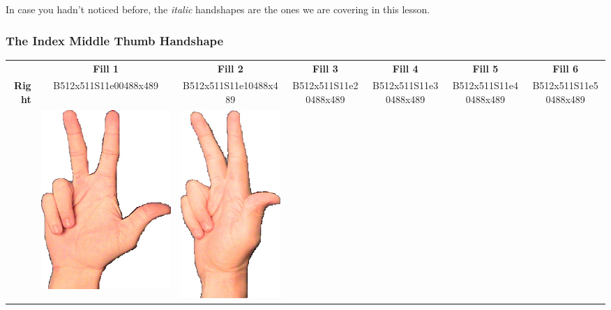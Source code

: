 \documentclass{article}
\begin{document}
In case you hadn't noticed before, the \emph{italic} handshapes are the ones we are covering in this lesson.

\subsubsection{The Index Middle Thumb Handshape}

\begin{center}
\begin{tabular}{r*{6}{c}}
&\textbf{Fill 1}&\textbf{Fill 2}&\textbf{Fill 3}&\textbf{Fill 4}&\textbf{Fill 5}&\textbf{Fill 6}\\
\multirow{2}{*}{\textbf{Right}}&
B512x511S11e00488x489&
B512x511S11e10488x489&
B512x511S11e20488x489&
B512x511S11e30488x489&
B512x511S11e40488x489&
B512x511S11e50488x489\\
&
\includegraphics[scale=0.1]{images/03-01-1.jpg}&
\includegraphics[scale=0.1]{images/03-01-2.jpg}&

\end{tabular}
\end{center}
\end{document}
